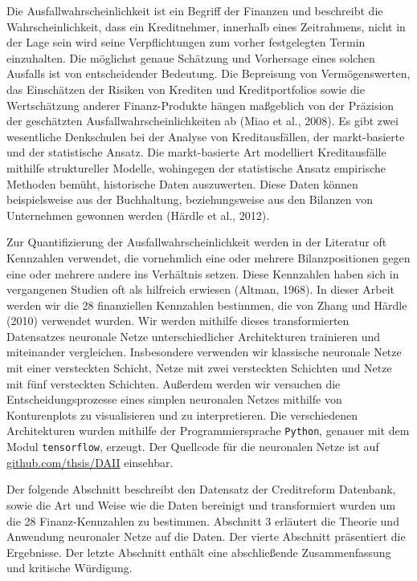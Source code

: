 \documentclass{article}
\begin{document}
Die Ausfallwahrscheinlichkeit ist ein Begriff der Finanzen und beschreibt die Wahrscheinlichkeit, dass ein Kreditnehmer, innerhalb eines Zeitrahmens, nicht in der Lage sein wird seine Verpflichtungen zum vorher festgelegten Termin einzuhalten. Die m{\"o}glichst genaue Sch{\"a}tzung und Vorhersage eines solchen Ausfalls ist von entscheidender Bedeutung. Die Bepreisung von Verm{\"o}genswerten, das Einsch{\"a}tzen der Risiken von Krediten und Kreditportfolios sowie die Wertsch{\"a}tzung anderer Finanz-Produkte h{\"a}ngen ma{\ss}geblich von der Pr{\"a}zision der gesch{\"a}tzten Ausfallwahrscheinlichkeiten ab (Miao et al., 2008). Es gibt zwei wesentliche Denkschulen bei der Analyse von Kreditausf{\"a}llen, der markt-basierte und der statistische Ansatz. Die markt-basierte Art modelliert Kreditausf{\"a}lle mithilfe struktureller Modelle, wohingegen der statistische Ansatz empirische Methoden bem{\"u}ht, historische Daten auszuwerten. Diese Daten k{\"o}nnen beispielsweise aus der Buchhaltung, beziehungsweise aus den Bilanzen von Unternehmen gewonnen werden (H{\"a}rdle et al., 2012).

Zur Quantifizierung der Ausfallwahrscheinlichkeit werden in der Literatur oft Kennzahlen verwendet, die vornehmlich eine oder mehrere Bilanzpositionen gegen eine oder mehrere andere ins Verh{\"a}ltnis setzen. Diese Kennzahlen haben sich in vergangenen Studien oft als hilfreich erwiesen (Altman, 1968). In dieser Arbeit werden wir die 28 finanziellen Kennzahlen bestimmen, die von Zhang und H{\"a}rdle (2010) verwendet wurden. Wir werden mithilfe dieses transformierten Datensatzes neuronale Netze unterschiedlicher Architekturen trainieren und miteinander vergleichen. Insbesondere verwenden wir klassische neuronale Netze mit einer versteckten Schicht, Netze mit zwei versteckten Schichten und Netze mit f{\"u}nf versteckten Schichten. Au{\ss}erdem werden wir versuchen die Entscheidungsprozesse eines simplen neuronalen Netzes mithilfe von Konturenplots zu visualisieren und zu interpretieren. Die verschiedenen Architekturen wurden mithilfe der Programmiersprache \texttt{Python}, genauer mit dem Modul \texttt{tensorflow}, erzeugt. Der Quellcode f{\"u}r die neuronalen Netze ist auf \href{https://github.com/thsis/DAII}{github.com/thsis/DAII} einsehbar.

Der folgende Abschnitt beschreibt den Datensatz der Creditreform Datenbank, sowie die Art und Weise wie die Daten bereinigt und transformiert wurden um die 28 Finanz-Kennzahlen zu bestimmen. Abschnitt 3 erl{\"a}utert die Theorie und Anwendung neuronaler Netze auf die Daten. Der vierte Abschnitt pr{\"a}sentiert die Ergebnisse. Der letzte Abschnitt enth{\"a}lt eine abschlie{\ss}ende Zusammenfassung und kritische W{\"u}rdigung.
\end{document}
